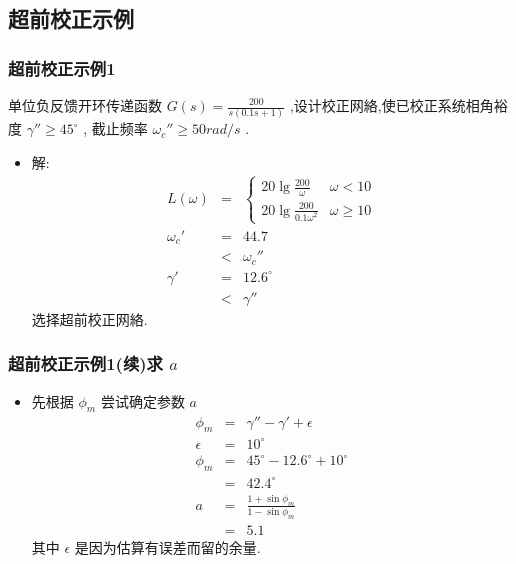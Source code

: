 \documentclass[table]{beamer}
\begin{document}
\subsection{超前校正示例}
\label{sec-2-2}
\begin{frame}
\frametitle{超前校正示例1}
\label{sec-2-2-1}

单位负反馈开环传递函数  $G(s)=\frac{200}{s(0.1s+1)}$ ,设计校正网絡,使已校正系统相角裕度  $\gamma''\geq 45^{\circ}$ , 截止频率  $\omega_c''\geq 50 rad/s$  .

\begin{itemize}
\item <2->解:
      \begin{eqnarray*}
       L(\omega) & = &\begin{cases} 20\lg\frac{200}{\omega} & \omega < 10 \\
      20\lg\frac{200}{0.1\omega^2} & \omega\geq 10
      \end{cases} \\
      \omega_c' &=& 44.7 \\
        &<& \omega_c'' \\
      \gamma' &=& 12.6^{\circ} \\
       &<& \gamma''
      \end{eqnarray*}
      选择超前校正网絡.
\end{itemize}
\end{frame}
\begin{frame}
\frametitle{超前校正示例1(续)求 $a$}
\label{sec-2-2-2}

\begin{itemize}
\item 先根据 $\phi_m$ 尝试确定参数  $a$ 
       \begin{eqnarray*}
       \phi_m & = &\gamma''-\gamma'+\epsilon \\
       \epsilon &=& 10^{\circ} \\
       \phi_{m} &=& 45^{\circ}-12.6^{\circ}+10^{\circ} \\
       	&=& 42.4^{\circ} \\
       a &=& \frac{1+\sin\phi_m}{1-\sin\phi_m} \\
       	&=& 5.1
       \end{eqnarray*}
       其中  $\epsilon$  是因为估算有误差而留的余量.
\end{itemize}
\end{frame}
\end{document}
